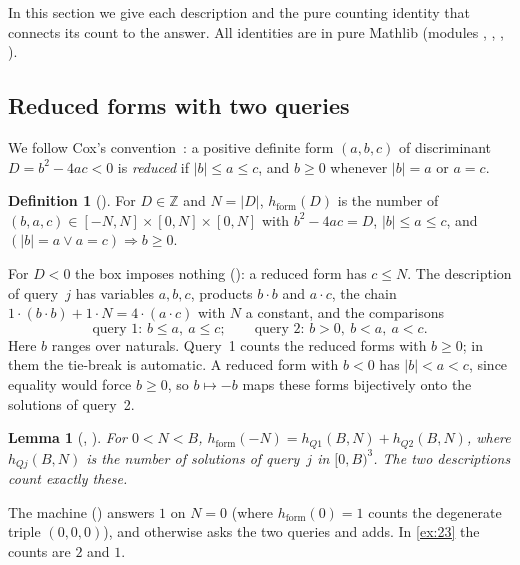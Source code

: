\documentclass[10pt]{amsart}
\theoremstyle{plain}
\newtheorem{lemma}[theorem]{Lemma}
\theoremstyle{definition}
\newtheorem{definition}[theorem]{Definition}
\theoremstyle{remark}
\numberwithin{equation}{section}
\newcommand{\Z}{\mathbb{Z}}
\newcommand{\hF}{h_{\mathrm{form}}}
\begin{document}
In this section we give each description and the pure counting identity that connects its count to
the answer. All identities are in pure Mathlib (modules , ,
, ).

\subsection{Reduced forms with two queries}
We follow Cox's convention~\cite[\S2]{Cox13}: a positive definite form $(a,b,c)$ of discriminant
$D=b^2-4ac<0$ is \emph{reduced} if $|b|\le a\le c$, and $b\ge0$ whenever $|b|=a$ or $a=c$.

\begin{definition}[]\label{def:hform}
For $D\in\Z$ and $N=|D|$, $\hF(D)$ is the number of $(b,a,c)\in[-N,N]\times[0,N]\times[0,N]$ with
$b^2-4ac=D$, $|b|\le a\le c$, and $(|b|=a\vee a=c)\Rightarrow b\ge0$.
\end{definition}

\noindent For $D<0$ the box imposes nothing (): a reduced form has $c\le N$. The
description of query~$j$ has variables $a,b,c$, products $b\cdot b$ and $a\cdot c$, the chain
$1\cdot(b\cdot b)+1\cdot N=4\cdot(a\cdot c)$ with $N$ a constant, and the comparisons
\[
  \text{query 1: } b\le a,\ a\le c;\qquad \text{query 2: } b>0,\ b<a,\ a<c .
\]
Here $b$ ranges over naturals. Query~1 counts the reduced forms with $b\ge0$; in them the tie-break is
automatic. A reduced form with $b<0$ has $|b|<a<c$, since equality would force $b\ge0$, so $b\mapsto-b$
maps these forms bijectively onto the solutions of query~2.

\begin{lemma}[, ]\label{lem:split}
For $0<N<B$, $\hF(-N)=h_{Q1}(B,N)+h_{Q2}(B,N)$, where $h_{Qj}(B,N)$ is the number of solutions of query~$j$
in $[0,B)^3$. The two descriptions count exactly these.
\end{lemma}

\noindent The machine () answers $1$ on $N=0$ (where $\hF(0)=1$ counts the degenerate triple
$(0,0,0)$), and otherwise asks the two queries and adds. In \cref{ex:23} the counts are $2$ and $1$.
\end{document}
